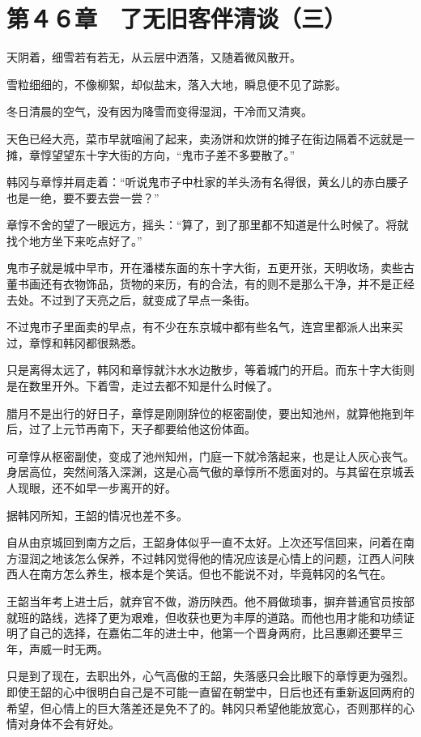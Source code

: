 \section{第４６章　了无旧客伴清谈（三）}

天阴着，细雪若有若无，从云层中洒落，又随着微风散开。

雪粒细细的，不像柳絮，却似盐末，落入大地，瞬息便不见了踪影。

冬日清晨的空气，没有因为降雪而变得湿润，干冷而又清爽。

天色已经大亮，菜市早就喧闹了起来，卖汤饼和炊饼的摊子在街边隔着不远就是一摊，章惇望望东十字大街的方向，“鬼市子差不多要散了。”

韩冈与章惇并肩走着：“听说鬼市子中杜家的羊头汤有名得很，黄幺儿的赤白腰子也是一绝，要不要去尝一尝？”

章惇不舍的望了一眼远方，摇头：“算了，到了那里都不知道是什么时候了。将就找个地方坐下来吃点好了。”

鬼市子就是城中早市，开在潘楼东面的东十字大街，五更开张，天明收场，卖些古董书画还有衣物饰品，货物的来历，有的合法，有的则不是那么干净，并不是正经去处。不过到了天亮之后，就变成了早点一条街。

不过鬼市子里面卖的早点，有不少在东京城中都有些名气，连宫里都派人出来买过，章惇和韩冈都很熟悉。

只是离得太远了，韩冈和章惇就汴水水边散步，等着城门的开启。而东十字大街则是在数里开外。下着雪，走过去都不知是什么时候了。

腊月不是出行的好日子，章惇是刚刚辞位的枢密副使，要出知池州，就算他拖到年后，过了上元节再南下，天子都要给他这份体面。

可章惇从枢密副使，变成了池州知州，门庭一下就冷落起来，也是让人灰心丧气。身居高位，突然间落入深渊，这是心高气傲的章惇所不愿面对的。与其留在京城丢人现眼，还不如早一步离开的好。

据韩冈所知，王韶的情况也差不多。

自从由京城回到南方之后，王韶身体似乎一直不太好。上次还写信回来，问着在南方湿润之地该怎么保养，不过韩冈觉得他的情况应该是心情上的问题，江西人问陕西人在南方怎么养生，根本是个笑话。但也不能说不对，毕竟韩冈的名气在。

王韶当年考上进士后，就弃官不做，游历陕西。他不屑做琐事，摒弃普通官员按部就班的路线，选择了更为艰难，但收获也更为丰厚的道路。而他也用才能和功绩证明了自己的选择，在嘉佑二年的进士中，他第一个晋身两府，比吕惠卿还要早三年，声威一时无两。

只是到了现在，去职出外，心气高傲的王韶，失落感只会比眼下的章惇更为强烈。即使王韶的心中很明白自己是不可能一直留在朝堂中，日后也还有重新返回两府的希望，但心情上的巨大落差还是免不了的。韩冈只希望他能放宽心，否则那样的心情对身体不会有好处。

